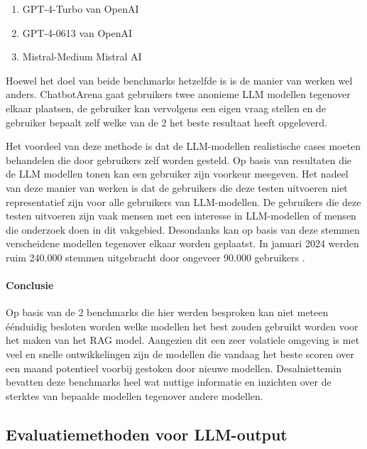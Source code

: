     \begin{enumerate}
        \item GPT-4-Turbo van OpenAI
        \item GPT-4-0613 van OpenAI
        \item Mistral-Medium Mistral AI
    \end{enumerate}
    
    Hoewel het doel van beide benchmarks hetzelfde is is de manier van werken wel anders. ChatbotArena gaat gebruikers twee anonieme LLM modellen tegenover elkaar plaatsen, de gebruiker kan vervolgens een eigen vraag stellen en de gebruiker bepaalt zelf welke van de 2 het beste resultaat heeft opgeleverd.
    
    Het voordeel van deze methode is dat de LLM-modellen realistische cases moeten behandelen die door gebruikers zelf worden gesteld. Op basis van resultaten die de LLM modellen tonen kan een gebruiker zijn voorkeur meegeven. Het nadeel van deze manier van werken is dat de gebruikers die deze testen uitvoeren niet representatief zijn voor alle gebruikers van LLM-modellen. De gebruikers die deze testen uitvoeren zijn vaak mensen met een interesse in LLM-modellen of mensen die onderzoek doen in dit vakgebied. Desondanks kan op basis van deze stemmen verscheidene modellen tegenover elkaar worden geplaatst. In januari 2024 werden ruim 240.000 stemmen uitgebracht door ongeveer 90.000 gebruikers \autocite{chiang2024chatbotarenaopenplatform}. 
    
    \paragraph{Conclusie}
    
    Op basis van de 2 benchmarks die hier werden besproken kan niet meteen éénduidig besloten worden welke modellen het best zouden gebruikt worden voor het maken van het RAG model. Aangezien dit een zeer volatiele omgeving is met veel en snelle ontwikkelingen zijn de modellen die vandaag het beste scoren over een maand potentieel voorbij gestoken door nieuwe modellen. Desalniettemin bevatten deze benchmarks heel wat nuttige informatie en inzichten over de sterktes van bepaalde modellen tegenover andere modellen. 
    
    \subsection{Evaluatiemethoden voor LLM-output}
   
